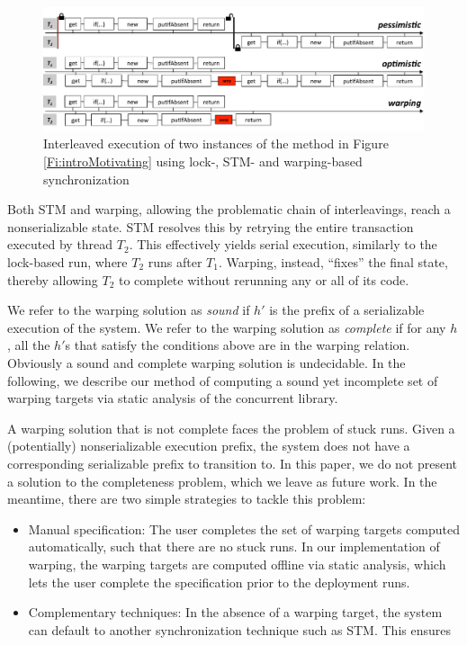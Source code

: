 \begin{figure}
	\begin{center}
	\includegraphics[width=\textwidth]{OverviewSlide.pdf}
	\end{center}
	\caption{\label{Fi:motivatingOverview}Interleaved execution of two instances of the method in Figure \ref{Fi:introMotivating} using lock-, STM- and warping-based synchronization}
\end{figure}

Both STM and warping, allowing the problematic chain of interleavings, reach a nonserializable state. STM resolves this by retrying the entire transaction executed by thread $T_2$. This effectively yields serial execution, similarly to the lock-based run, where $T_2$ runs after $T_1$. Warping, instead, ``fixes'' the final state, thereby allowing $T_2$ to complete without rerunning any or all of its code.

We refer to the warping solution as \emph{sound} if $h'$ is the prefix of a serializable execution of the system. We refer to the warping solution as \emph{complete} if for any $h$, all the $h'$s that satisfy the conditions above are in the warping relation. Obviously a sound and complete warping solution is undecidable. In the following, we describe our method of computing a sound yet incomplete set of warping targets via static analysis of the concurrent library.

A warping solution that is not complete faces the problem of stuck runs. Given a (potentially) nonserializable execution prefix, the system does not have a corresponding serializable prefix to transition to. In this paper, we do not present a solution to the completeness problem, which we leave as future work. In the meantime, there are two simple strategies to tackle this problem:
\begin{itemize}
	\item Manual specification: The user completes the set of warping targets computed automatically, such that there are no stuck runs. In our implementation of warping, the warping targets are computed offline via static analysis, which lets the user complete the specification prior to the deployment runs.
	\item Complementary techniques: In the absence of a warping target, the system can default to another synchronization technique such as STM. This ensures 
\end{itemize}


